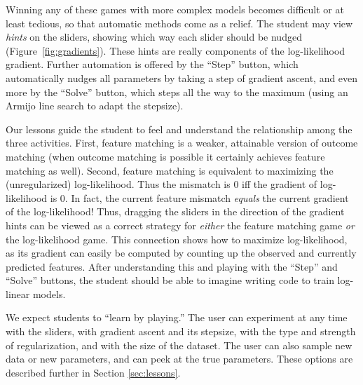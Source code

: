 \documentclass[11pt,letterpaper]{article}
\begin{document}
Winning any of these games with more complex models becomes difficult
or at least tedious, so that automatic methods come as a relief.  The
student may view {\em hints} on the sliders, showing which way each
slider should be nudged (Figure~\ref{fig:gradients}).  These hints are
really components of the log-likelihood gradient.  Further automation
is offered by the ``Step'' button, which automatically nudges all
parameters by taking a step of gradient ascent, and even more by the
``Solve'' button, which steps all the way to the maximum (using an
Armijo line search to adapt the stepsize).

Our lessons guide the student to feel and understand the relationship
among the three activities.  First, feature matching is a weaker,
attainable version of outcome matching (when outcome matching is
possible it certainly achieves feature matching as well).  Second,
feature matching is equivalent to maximizing the (unregularized)
log-likelihood.  Thus the mismatch is 0 iff the gradient of
log-likelihood is 0.  In fact, the current feature mismatch {\em
  equals} the current gradient of the log-likelihood!  Thus, dragging
the sliders in the direction of the gradient hints can be viewed as a
correct strategy for {\em either} the feature matching game {\em or}
the log-likelihood game.  This connection shows how to maximize
log-likelihood, as its gradient can easily be computed by counting up the
observed and currently predicted features.  After understanding this
and playing with the ``Step'' and ``Solve'' buttons, the student
should be able to imagine writing code to train log-linear models.


We expect students to ``learn by playing.''  The user can experiment
at any time with the sliders, with gradient ascent and its stepsize,
with the type and strength of regularization, and with the size of the
dataset.  The user can also sample new data or new parameters, and can
peek at the true parameters.  These options are described further
in Section \ref{sec:lessons}.
\end{document}
